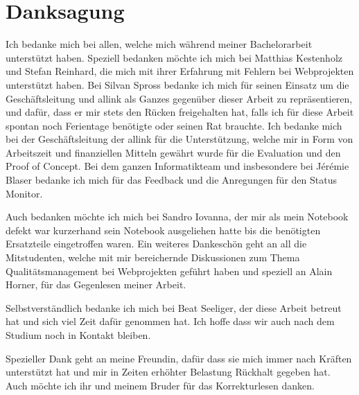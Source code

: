 \section{Danksagung}
\label{sec:danksagung}
Ich bedanke mich bei allen, welche mich während meiner Bachelorarbeit unterstützt haben. Speziell bedanken möchte ich mich bei Matthias Kestenholz und Stefan Reinhard, die mich mit ihrer Erfahrung mit Fehlern bei Webprojekten unterstützt haben. Bei Silvan Spross bedanke ich mich für seinen Einsatz um die Geschäftsleitung und allink als Ganzes gegenüber dieser Arbeit zu repräsentieren, und dafür, dass er mir stets den Rücken freigehalten hat, falls ich für diese Arbeit spontan noch Ferientage benötigte oder seinen Rat brauchte. Ich bedanke mich bei der Geschäftsleitung der allink für die Unterstützung, welche mir in Form von Arbeitszeit und finanziellen Mitteln gewährt wurde für die Evaluation und den Proof of Concept. Bei dem ganzen Informatikteam und insbesondere bei Jérémie Blaser bedanke ich mich für das Feedback und die Anregungen für den Status Monitor.

Auch bedanken möchte ich mich bei Sandro Iovanna, der mir als mein Notebook defekt war kurzerhand sein Notebook ausgeliehen hatte bis die benötigten Ersatzteile eingetroffen waren. Ein weiteres Dankeschön geht an all die Mitstudenten, welche mit mir bereichernde Diskussionen zum Thema Qualitätsmanagement bei Webprojekten geführt haben und speziell an Alain Horner, für das Gegenlesen meiner Arbeit.

Selbstverständlich bedanke ich mich bei Beat Seeliger, der diese Arbeit betreut hat und sich viel Zeit dafür genommen hat. Ich hoffe dass wir auch nach dem Studium noch in Kontakt bleiben.

Spezieller Dank geht an meine Freundin, dafür dass sie mich immer nach Kräften unterstützt hat und mir in Zeiten erhöhter Belastung Rückhalt gegeben hat. Auch möchte ich ihr und meinem Bruder für das Korrekturlesen danken.
